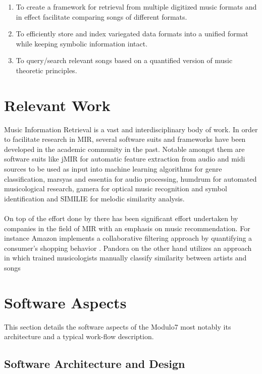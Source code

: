 \documentclass{article}
\begin{document}
\begin{enumerate}
\item To create a framework for retrieval from multiple digitized music formats and in effect facilitate comparing songs of different formats. 
\item To efficiently store and index variegated data formats into a unified format while keeping symbolic information intact.  
\item To query/search relevant songs based on a quantified version of music theoretic principles. 
\end{enumerate}

%
\section{Relevant Work} \label{sec:relevantwork}

Music Information Retrieval is a vast and interdisciplinary body of work. In order to facilitate research in MIR, several software suits and frameworks have been developed in the academic community in the past. Notable amongst them are software suits like jMIR \cite{jMIR} for automatic feature extraction from audio and midi sources to be used as input into machine learning algorithms for genre classification, marsyas \cite{marsyas} and essentia \cite{essentia} for audio processing, humdrum \cite{humdrum} for automated musicological research, gamera \cite{gamera} for optical music recognition and symbol identification and SIMILIE \cite{similie} for melodic similarity analysis. \\\\
On top of the effort done by there has been significant effort undertaken by companies in the field of MIR with an emphasis on music recommendation. For instance Amazon implements a collaborative filtering approach by quantifying a consumer's shopping behavior \cite{amazonreco}. Pandora on the other hand utilizes an approach in which trained musicologists manually classify similarity between artists and songs \cite{pa}
\section{Software Aspects}\label{sec:architecture}

This section details the software aspects of the Modulo7 most notably its architecture and a typical work-flow description. 

\subsection{Software Architecture and Design}
\end{document}
